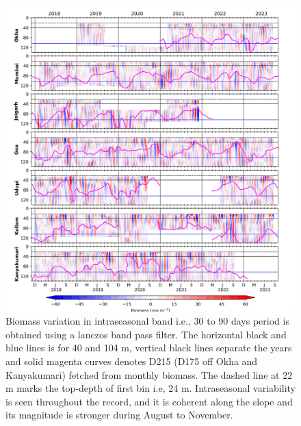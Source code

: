 \documentclass[authoryear,review,12pt]{elsarticle}
\begin{document}
\begin{figure}[htbp]
	\centering
	\includegraphics[width=\textwidth]{./figures/intraseasonal_30_90_181.jpeg} 
	\captionsetup{justification=justified,font=footnotesize,skip=0.05\baselineskip,width=\textwidth}
	\caption{Biomass variation in intraseasonal band i.e., 30 to 90 days period is obtained using a lanczos band pass filter. The horizontal black and blue lines is for 40 and 104 m, vertical black lines separate the years and solid magenta curves denotes D215 (D175 off Okha and Kanyakumari) fetched from monthly biomass. The dashed line at 22 m marks the top-depth of first bin i.e, 24 m. Intraseasonal variability is seen throughout the record, and it is coherent along the slope and its magnitude is stronger during August to November.}
	\label{fig:intraseasonal}
\end{figure}
\end{document}
